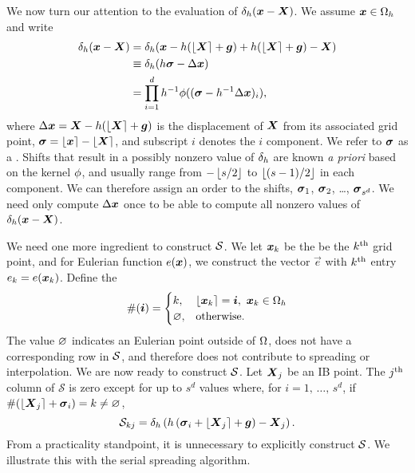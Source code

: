 We now turn our attention to the evaluation of $\delta_h(\boldsymbol{x}-\boldsymbol{X})$. We assume
$\boldsymbol{x}\in\Omega_h$ and write
\begin{equation}
    \label{eq:delta-defs}
    \begin{aligned}
        \delta_h(\boldsymbol{x}-\boldsymbol{X})
        &= \delta_h(\boldsymbol{x}-h(\left\lfloor{\boldsymbol{X}}\right\rceil+\boldsymbol{g}) + h(\left\lfloor{\boldsymbol{X}}\right\rceil+\boldsymbol{g}) - \boldsymbol{X}) \\
        &\equiv \delta_h(h\boldsymbol{\sigma} - \Delta\boldsymbol{x}) \\
        &= \prod_{i=1}^d h^{-1}\phi((\boldsymbol{\sigma} - h^{-1}\Delta\boldsymbol{x})_i),
    \end{aligned}
\end{equation}
where $\Delta\boldsymbol{x} = \boldsymbol{X}-h(\left\lfloor{\boldsymbol{X}}\right\rceil+\boldsymbol{g})$ is the displacement of $\boldsymbol{X}$ from its associated
grid point, $\boldsymbol{\sigma}=\left\lfloor{\boldsymbol{x}}\right\rceil-\left\lfloor{\boldsymbol{X}}\right\rceil$, and subscript $i$ denotes the $i$ component. We
refer to $\boldsymbol{\sigma}$ as a . Shifts that result in a possibly nonzero value of
$\delta_h$ are known \emph{a priori} based on the kernel $\phi$, and usually range
from $-\left\lfloor{s/2}\right\rfloor$ to $\left\lfloor{(s-1)/2}\right\rfloor$ in each component. We can therefore assign an
order to the shifts, $\boldsymbol{\sigma}_1$, $\boldsymbol{\sigma}_2$, \dots, $\boldsymbol{\sigma}_{s^d}$. We need only compute
$\Delta\boldsymbol{x}$ once to be able to compute all nonzero values of $\delta_h(\boldsymbol{x}-\boldsymbol{X})$.

We need one more ingredient to construct $\mathcal{S}$. We let $\boldsymbol{x}_k$ be the be the $k\textsuperscript{th}$
grid point, and for Eulerian function $e(\boldsymbol{x})$, we construct the vector $\vec{e}$ with
$k\textsuperscript{th}$ entry $e_k = e(\boldsymbol{x}_k)$. Define the 
\begin{equation}
    \label{eq:grid-index-fn}
    \#(\boldsymbol{i}) = \begin{cases}
        k, & \left\lfloor{\boldsymbol{x}_k}\right\rceil=\boldsymbol{i},\ \boldsymbol{x}_k\in\Omega_h \\
        \varnothing, & \text{otherwise}.
    \end{cases}
\end{equation}
The value $\varnothing$ indicates an Eulerian point outside of $\Omega$, does not have a
corresponding row in $\mathcal{S}$, and therefore does not contribute to spreading or
interpolation. We are now ready to construct $\mathcal{S}$. Let $\boldsymbol{X}_j$ be an IB
point. The $j\textsuperscript{th}$ column of $\mathcal{S}$ is zero except for up to $s^d$ values where,
for $i=1,\,\ldots,\,s^d$, if $\#(\left\lfloor{\boldsymbol{X}_j}\right\rceil+\boldsymbol{\sigma}_i)=k\neq\varnothing$,
\begin{equation}
    \label{eq:s-columnwise}
    \mathcal{S}_{kj} = \delta_h\left(h\left(\boldsymbol{\sigma}_i+\left\lfloor{\boldsymbol{X}_j}\right\rceil+\boldsymbol{g}\right)-\boldsymbol{X}_j\right).
\end{equation}
From a practicality standpoint, it is unnecessary to explicitly construct $\mathcal{S}$. We
illustrate this with the serial spreading algorithm.

